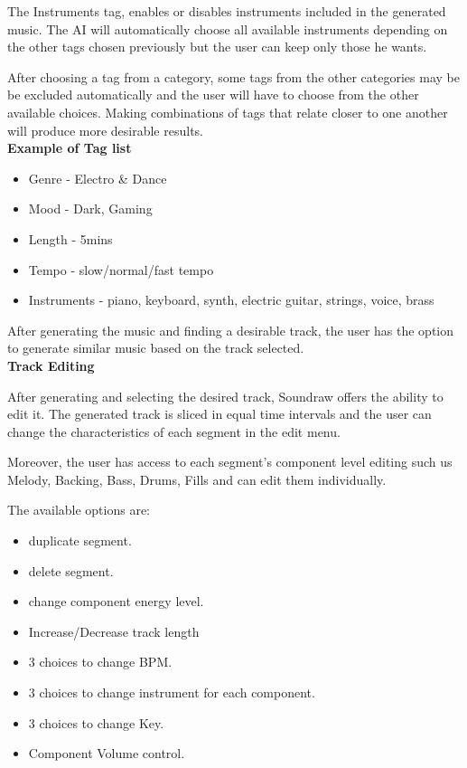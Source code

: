 \documentclass[a4paper,one side,12pt]{book}
\begin{document}
The Instruments tag, enables or disables instruments included in the
generated music. The AI will automatically choose all available
instruments depending on the other tags chosen previously but the user
can keep only those he wants.

After choosing a tag from a category, some tags from the other
categories may be be excluded automatically and the user will have to
choose from the other available choices. Making combinations of tags
that relate closer to one another will produce more desirable results.\\

\textbf{Example of Tag list}

\begin{itemize}
\item
  Genre - Electro \& Dance
\item
  Mood - Dark, Gaming
\item
  Length - 5mins
\item
  Tempo - slow/normal/fast tempo
\item
  Instruments - piano, keyboard, synth, electric guitar, strings, voice,
  brass
\end{itemize}

After generating the music and finding a desirable track, the user has
the option to generate similar music based on the track selected.\\

\textbf{Track Editing}

After generating and selecting the desired track, Soundraw offers the
ability to edit it. The generated track is sliced in equal time
intervals and the user can change the characteristics of each segment in
the edit menu.

Moreover, the user has access to each segment's component level editing
such us Melody, Backing, Bass, Drums, Fills and can edit them
individually.

The available options are:

\begin{itemize}
\item
  duplicate segment.
\item
  delete segment.
\item
  change component energy level.
\item
  Increase/Decrease track length
\item
  3 choices to change BPM.
\item
  3 choices to change instrument for each component.
\item
  3 choices to change Key.
\item
  Component Volume control.
\end{itemize}
\end{document}
